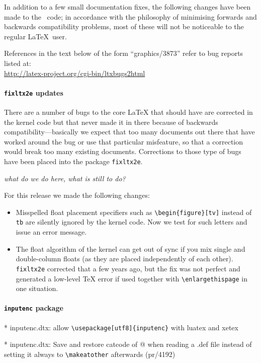 \documentclass{ltnews}
\begin{document}
In addition to a few small documentation fixes, the following changes
have been made to the \LaTeXe\ code; in accordance with the philosophy
of minimising forwards and backwards compatibility problems, most of
these will not be noticeable to the regular \LaTeX\ user.

References in the text below of the form ``graphics/3873'' refer to
bug reports listed
at:\\ \url{http://latex-project.org/cgi-bin/ltxbugs2html}


\paragraph{\texttt{fixltx2e} updates}

There are a number of bugs to the core \LaTeX{} that should have are
corrected in the kernel code but that never made it in there because
of backwards compatibility---basically we expect that too many
documents out there that have worked around the bug or use that
particular misfeature, so that a correction would break too many
existing documents. Corrections to those type of bugs have been placed
into the package \texttt{fixltx2e}.
 
\textit{what do we do here, what is still to do?}

For this release we made the following changes:
\begin{itemize}
\item
   Misspelled float placement specifiers such as
   \verb=\begin{figure}[tv]= instead of \texttt{tb} are silently
   ignored by the kernel code.  Now we test for such letters and issue
   an error message.
\item
   The float algorithm of the kernel can get out of sync if you mix
   single and double-column floats (as they are placed independently
   of each other). \texttt{fixltx2e} corrected that a few years ago,
   but the fix was not perfect and generated a low-level \TeX{} error
   if used together with \verb=\enlargethispage= in one situation.
\end{itemize}



\paragraph{\texttt{inputenc} package}


\begin{itshape}
	* inputenc.dtx: allow \verb=\usepackage[utf8]{inputenc}= with luatex and xetex

	* inputenc.dtx: Save and restore catcode of @ when reading a .def file
	instead of setting it always to \verb=\makeatother= afterwards (pr/4192)

\end{itshape}
\end{document}
